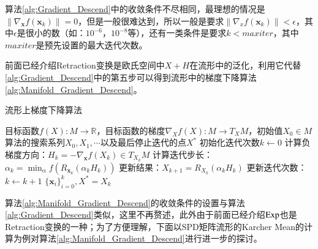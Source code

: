 算法\ref{alg:Gradient_Descend}中的收敛条件不尽相同，最理想的情况是$\|\nabla_{\bm{x}} f(\bm{x}_k)\|=0$，但是一般很难达到，所以一般是要求$\|\nabla_x f(\bm{x}_k)\|<\epsilon$，其中$\epsilon$是很小的数（如：$10^{-6}$，$10^{-8}$等），还有一类条件是要求$k<maxiter$，其中$maxiter$是预先设置的最大迭代次数。

前面已经介绍Retraction变换是欧氏空间中$X+H$在流形中的泛化，利用它代替\ref{alg:Gradient_Descend}中的第五步可以得到流形中的梯度下降算法\ref{alg:Manifold_Gradient_Descend}。
\begin{algorithm}[htb]
\caption{流形上梯度下降算法}
\label{alg:Manifold_Gradient_Descend}
\begin{algorithmic}[1]
\REQUIRE 目标函数$f(X):M\rightarrow \mathbb{R}$，目标函数的梯度$\nabla_X f(X):M \rightarrow T_{X}M$，初始值$X_0 \in M$
\ENSURE 算法的搜索系列$X_0,X_1,\cdots$以及最后停止迭代的点$X^{*}$
\STATE 初始化迭代次数$k \leftarrow 0$
\STATE 计算负梯度方向：$H_{k}=-\nabla_{\bm{x}}f(X_k) \in T_{X_k}M$
\STATE 计算迭代步长：$\alpha_{k}=\min_{\alpha}f(R_{\bm{x}_{k}}(\alpha_{k}H_{k}))$
\STATE 更新结果：$X_{k+1}=R_{X_{k}}(\alpha_{k}H_{k})$
\STATE 更新迭代次数：$k\leftarrow k+1$
\ENDWHILE
\RETURN $\{\bm{x}_i\}_{i=0}^{k},X^{*}=X_{k}$
\end{algorithmic}
\end{algorithm}

算法\ref{alg:Manifold_Gradient_Descend}的收敛条件的设置与算法\ref{alg:Gradient_Descend}类似，这里不再赘述，此外由于前面已经介绍$\rm Exp$也是Retraction变换的一种；为了方便理解，下面以SPD矩阵流形的Karcher Mean的计算为例对算法\ref{alg:Manifold_Gradient_Descend}进行进一步的探讨。

